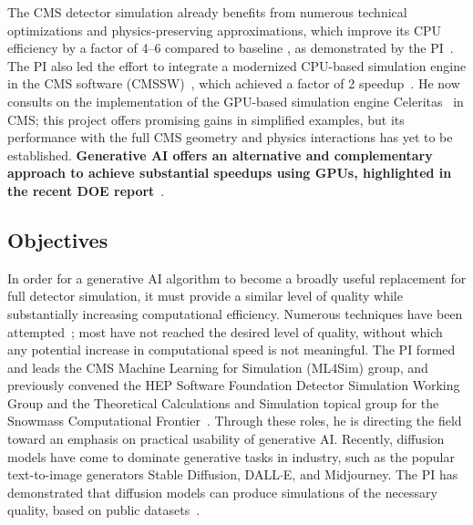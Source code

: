 The CMS detector simulation already benefits from numerous technical optimizations and physics-preserving approximations,
which improve its CPU efficiency by a factor of 4--6 compared to baseline \GEANTfour, as demonstrated by the PI~\cite{Pedro:2019mkq}.
The PI also led the effort to integrate a modernized CPU-based simulation engine in the CMS software (CMSSW)~\cite{Pedro:2020kbk},
which achieved a factor of 2 speedup~\cite{Amadio:2020ink}.
He now consults on the implementation of the GPU-based simulation engine Celeritas~\cite{Tognini:2022nmd} in CMS;
this project offers promising gains in simplified examples, but its performance with the full CMS geometry and physics interactions has yet to be established.
\textbf{Generative AI offers an alternative and complementary approach to achieve substantial speedups using GPUs, highlighted in the recent DOE report}~\cite{AI4SES}.

\subsection{Objectives}\label{subsec:simobj}

In order for a generative AI algorithm to become a broadly useful replacement for full detector simulation,
it must provide a similar level of quality while substantially increasing computational efficiency.
Numerous techniques have been attempted~\cite{Adelmann:2022ozp,Hashemi:2023rgo};
most have not reached the desired level of quality, without which any potential increase in computational speed is not meaningful.
The PI formed and leads the CMS Machine Learning for Simulation (ML4Sim) group, and previously convened the HEP Software Foundation Detector Simulation Working Group
and the Theoretical Calculations and Simulation topical group for the Snowmass Computational Frontier~\cite{Boyle:2022cvo,Elvira:2022wyn}.
Through these roles, he is directing the field toward an emphasis on practical usability of generative AI.
Recently, diffusion models have come to dominate generative tasks in industry, such as the popular text-to-image generators Stable Diffusion, DALL${\cdot}$E, and Midjourney.
The PI has demonstrated that diffusion models can produce simulations of the necessary quality, based on public datasets~\cite{Amram:2023onf}.

